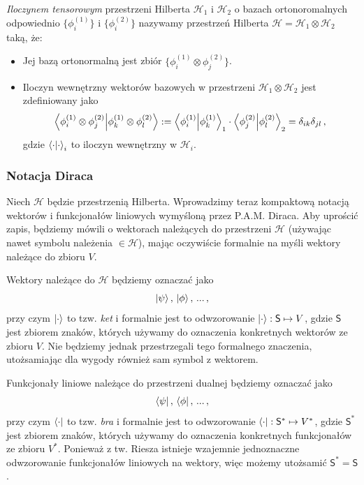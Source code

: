 \documentclass{myclass}
\begin{document}
\begin{definition}
\textit{Iloczynem tensorowym} przestrzeni Hilberta \(\mathscr{H}_1\) i \(\mathscr{H}_2\) o bazach
ortonoromalnych odpowiednio \(\{\phi_i^{(1)}\}\) i \(\{\phi_i^{(2)}\}\) nazywamy przestrzeń Hilberta
\(\mathscr{H} = \mathscr{H}_1 \otimes \mathscr{H}_2\) taką, że:
\begin{itemize}
    
    \item Jej bazą ortonormalną jest zbiór \(\{\phi_i^{(1)} \otimes \phi_j^{(2)}\}\).

    \item Iloczyn wewnętrzny wektorów bazowych w przestrzeni \(\mathscr{H}_1 \otimes \mathscr{H}_2\)
    jest zdefiniowany jako
    \begin{equation*}
        \braket{\phi_i^{(1)} \otimes \phi_j^{(2)}}{\phi_k^{(1)} \otimes \phi_l^{(2)}} := \braket{\phi_i^{(1)}}{\phi_k^{(1)}}_1 \cdot \braket{\phi_j^{(2)}}{\phi_l^{(2)}}_2 = \delta_{ik}\delta_{jl}\,,
    \end{equation*}
    gdzie \(\braket{\cdot}_i\) to iloczyn wewnętrzny w \(\mathscr{H}_i\).
\end{itemize}
\end{definition}

\subsubsection*{Notacja Diraca}

Niech \(\mathscr{H}\) będzie przestrzenią Hilberta. Wprowadzimy teraz kompaktową notacją wektorów i
funkcjonałów liniowych wymyśloną przez P.A.M. Diraca. Aby uprościć zapis, będziemy mówili o
wektorach należących do przestrzeni \(\mathscr{H}\) (używając nawet symbolu należenia \(\in
\mathscr{H}\)), mając oczywiście formalnie na myśli wektory należące do zbioru \(V\).

Wektory należące do \(\mathscr{H}\) będziemy oznaczać jako
\begin{equation*}
    \ket{\psi},\, \ket{\phi},\, ...\,,
\end{equation*}
przy czym \(\ket{\cdot}\) to tzw. \textit{ket} i formalnie jest to odwzorowanie \(\ket{\cdot} :
\mathsf{S} \mapsto V\), gdzie \(\mathsf{S}\) jest zbiorem znaków, których używamy do oznaczenia
konkretnych wektorów ze zbioru \(V\). Nie będziemy jednak przestrzegali tego formalnego znaczenia,
utożsamiając dla wygody również  sam symbol z wektorem.

Funkcjonały liniowe należące do przestrzeni dualnej będziemy oznaczać jako
\begin{equation*}
    \bra{\psi},\, \bra{\phi},\, ...\,,
\end{equation*}
przy czym \(\bra{\cdot}\) to tzw. \textit{bra} i formalnie jest to odwzorowanie \(\bra{\cdot} :
\mathsf{S}^* \mapsto V^*\), gdzie \(\mathsf{S}^*\) jest zbiorem znaków, których używamy do
oznaczenia konkretnych funkcjonałów ze zbioru \(V^*\). Ponieważ z tw. Riesza istnieje wzajemnie
jednoznaczne odwzorowanie funkcjonałów liniowych na wektory, więc możemy utożsamić \(\mathsf{S}^* =
\mathsf{S}\).
\end{document}
